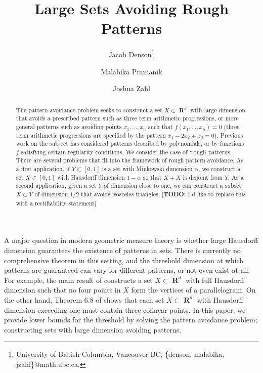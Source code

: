 \documentclass[dvipsnames,letterpaper,12pt]{article}
\title{Large Sets Avoiding Rough Patterns}
\author{Jacob Denson\thanks{University of British Columbia, Vancouver BC, \{denson, malabika, jzahl\}@math.ubc.ca.} \and Malabika Pramanik\footnotemark[1] \and Joshua Zahl\footnotemark[1]}
\numberwithin{equation}{section}
\theoremstyle{plain}
\DeclareMathOperator{\RR}{\mathbf{R}}
\begin{document}
\maketitle

\begin{abstract}
	The pattern avoidance problem seeks to construct a set $X\subset \RR^d$ with large dimension that avoids a prescribed pattern such as three term arithmetic progressions, or more general patterns such as avoiding points $x_1, \dots, x_n$ such that $f(x_1, \dots, x_n) = 0$ (three term arithmetic progressions are specified by the pattern $x_1 - 2x_2 + x_3 = 0$). Previous work on the subject has considered patterns described by polynomials, or by functions $f$ satisfying certain regularity conditions. We consider the case of `rough patterns.
	There are several problems that fit into the framework of rough pattern avoidance. As a first application, if $Y\subset[0,1]$ is a set with Minkowski dimension $\alpha$, we construct a set $X\subset[0,1]$ with Hausdorff dimension $1-\alpha$ so that $X+X$ is disjoint from $Y$. As a second application, given a set $Y$ of dimension close to one, we can construct a subset $X\subset Y$ of dimension $1/2$ that avoids isosceles triangles. [{\bf{TODO:}} I'd like to replace this with a rectifiability statement]
\end{abstract}













A major question in modern geometric measure theory is whether large Hausdorff dimension guarantees the existence of patterns in sets. There is currently no comprehensive theorem in this setting, and the threshold dimension at which patterns are guaranteed can vary for different patterns, or not even exist at all. For example, the main result of \cite{Maga} constructs a set $X \subset \RR^d$ with full Hausdorff dimension such that no four points in $X$ form the vertices of a parallelogram. On the other hand, Theorem 6.8 of \cite{Matilla} shows that each set $X \subset \RR^d$ with Hausdorff dimension exceeding one must contain three colinear points. In this paper, we provide lower bounds for the threshold by solving the pattern avoidance problem; constructing sets with large dimension avoiding patterns.
\end{document}

